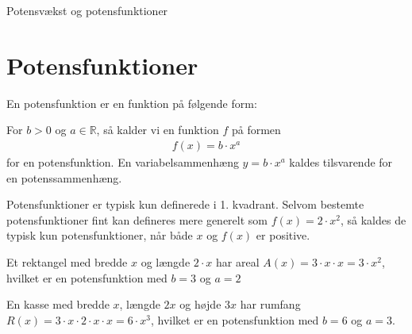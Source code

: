 
\begin{center}
\Huge
Potensvækst og potensfunktioner
\end{center}
\section*{Potensfunktioner}

En potensfunktion er en funktion på følgende form:
\begin{defn}
For $b>0$ og $a\in \mathbb{R}$, så kalder vi en funktion $f$ på formen 
\begin{align*}
f(x) = b\cdot x^a
\end{align*}
for en potensfunktion. En variabelsammenhæng $y=b\cdot x^a$ kaldes tilsvarende for en potenssammenhæng.
\end{defn}
Potensfunktioner er typisk kun definerede i 1. kvadrant. Selvom bestemte potensfunktioner fint kan defineres mere generelt som $f(x) = 2\cdot x^2$, så kaldes de typisk kun potensfunktioner, når både $x$ og $f(x)$ er positive. 
\begin{exa}
Et rektangel med bredde $x$ og længde $2\cdot x$ har areal $A(x) = 3\cdot x\cdot x = 3\cdot x^2$, hvilket er en potensfunktion med $b=3$ og $a=2$
\end{exa}
\begin{exa}
En kasse med bredde $x$, længde $2x$ og højde $3x$ har rumfang $R(x) = 3\cdot x \cdot 2\cdot x\cdot x = 6\cdot x^3$, hvilket er en potensfunktion med $b = 6$ og $a=3$.
\end{exa}

